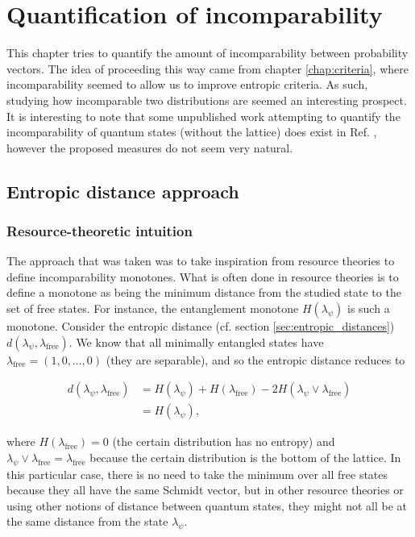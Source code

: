 \chapter{Quantification of incomparability} \label{chap:incomparability}

This chapter tries to quantify the amount of incomparability between probability vectors. The idea of proceeding this way came from chapter \ref{chap:criteria}, where incomparability seemed to allow us to improve entropic criteria. As such, studying how incomparable two distributions are seemed an interesting prospect. It is interesting to note that some unpublished work attempting to quantify the incomparability of quantum states (without the lattice) does exist in Ref. \cite{hu_characterizing_2018}, however the proposed measures do not seem very natural.



\section{Entropic distance approach}

\subsection{Resource-theoretic intuition}

The approach that was taken was to take inspiration from resource theories to define incomparability monotones. What is often done in resource theories is to define a monotone as being the minimum distance from the studied state to the set of free states. For instance, the entanglement monotone $H(\lambda_\psi)$ is such a monotone. Consider the entropic distance (cf. section \ref{sec:entropic_distances}) $d(\lambda_\psi, \lambda_{\text{free}})$. We know that all minimally entangled states have $\lambda_\text{free} = (1, 0, \dots, 0)$ (they are separable), and so the entropic distance reduces to

\begin{align}
    d(\lambda_\psi, \lambda_\text{free}) &= H(\lambda_\psi) + H(\lambda_\text{free}) - 2 H(\lambda_\psi \vee \lambda_\text{free})\\
                                      &= H(\lambda_\psi),
\end{align}

\noindent where $H(\lambda_\text{free}) = 0$ (the certain distribution has no entropy) and $\lambda_\psi \vee \lambda_\text{free} = \lambda_\text{free}$ because the certain distribution is the bottom of the lattice. In this particular case, there is no need to take the minimum over all free states because they all have the same Schmidt vector, but in other resource theories or using other notions of distance between quantum states, they might not all be at the same distance from the state $\lambda_\psi$.

